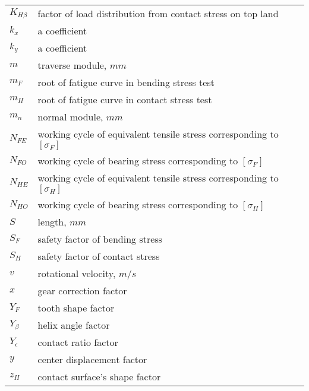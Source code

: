 \begin{tabular}[t]{lp{7cm}}
	$ K_{H\beta} $ & factor of load distribution from contact stress on top land\\
	$ k_x $ & a coefficient\\
	$ k_y $ & a coefficient\\
	$ m $ & traverse module, $ mm $\\
	$ m_F $ & root of fatigue curve in bending stress test\\
	$ m_H $ & root of fatigue curve in contact stress test\\
	$ m_n $ & normal module, $ mm $\\
	$ N_{FE} $ & working cycle of equivalent tensile stress corresponding to $ [\sigma_F] $\\
	$ N_{FO} $ & working cycle of bearing stress corresponding to $ [\sigma_F] $\\
	$ N_{HE} $ & working cycle of equivalent tensile stress corresponding to $ [\sigma_H] $\\
	$ N_{HO} $ & working cycle of bearing stress corresponding to $ [\sigma_H] $\\
	$ S $ & length, $ mm $\\
	$ S_F $ & safety factor of bending stress\\
	$ S_H $ & safety factor of contact stress\\
	$ v $ & rotational velocity, $ m/s $\\
	$ x $ & gear correction factor\\
	$ Y_F $ & tooth shape factor\\
	$ Y_\beta $ & helix angle factor\\
	$ Y_\epsilon $ & contact ratio factor\\
	$ y $ & center displacement factor\\
	$ z_H $ & contact surface's shape factor\\
\end{tabular}
